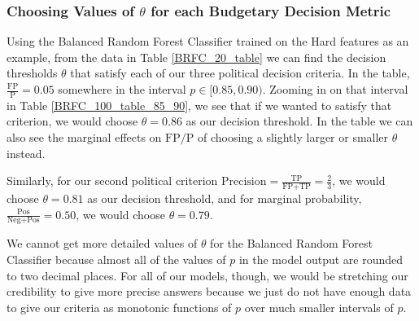 \FloatBarrier

\subsubsection{Choosing Values of $\theta$ for each Budgetary Decision Metric}
\label{choosing_theta}

Using the Balanced Random Forest Classifier trained on the Hard features as an example, from the data in Table \ref{BRFC_20_table} we can find the decision thresholds $\theta$ that satisfy each of our three political decision criteria.  In the table, $\frac{\text{FP}}{\text{P}} = 0.05$ somewhere in the interval $p \in [0.85,0.90)$.  Zooming in on that interval in Table \ref{BRFC_100_table_85_90}, we see that if we wanted to satisfy that criterion, we would choose $\theta = 0.86$ as our decision threshold.  In the table we can also see the marginal effects on $\text{FP}/\text{P}$ of choosing a slightly larger or smaller $\theta$ instead.  

Similarly, for our second political criterion $\text{Precision} = \frac{\text{TP}}{\text{FP} + \text{TP}} = \frac{2}{3}$, we would choose $\theta = 0.81$ as our decision threshold, and for marginal probability, $\frac{\text{Pos}}{\text{Neg} + \text{Pos}} = 0.50$, we would choose $\theta = 0.79$.  

We cannot get more detailed values of $\theta$ for the Balanced Random Forest Classifier because almost all of the values of $p$ in the model output are rounded to two decimal places.  For all of our models, though, we would be stretching our credibility to give more precise answers because we just do not have enough data to give our criteria as monotonic functions of $p$ over much smaller intervals of $p$.  
 
